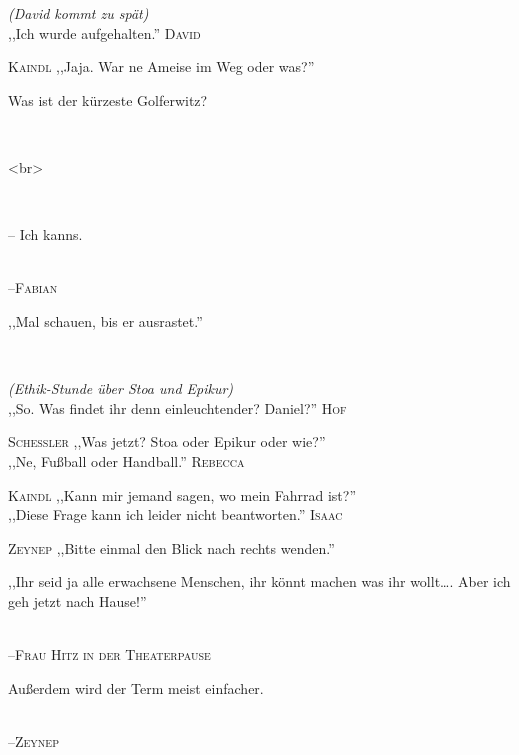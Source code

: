 \vspace{3mm}
\raggedright \emph{\footnotesize (David kommt zu spät)}\\
\raggedleft ,,Ich wurde aufgehalten.'' \textsc{\footnotesize David}\\
\hangindent=0.7cm
\raggedright \textsc{\footnotesize Kaindl} ,,Jaja. War ne Ameise im Weg oder was?''\\

\vspace{3mm}
{\raggedright Was ist der kürzeste Golferwitz?}\\
{\raggedright <br>}\\
{\raggedright -- Ich kanns.}\\
\raggedleft \textsc{\footnotesize --\/Fabian}\\

\vspace{3mm}
{\raggedright ,,Mal schauen, bis er ausrastet.''}\\

\vspace{3mm}
\raggedright \emph{\footnotesize (Ethik-Stunde über Stoa und Epikur)}\\
\raggedleft ,,So. Was findet ihr denn einleuchtender? Daniel?'' \textsc{\footnotesize Hof}\\
\hangindent=0.7cm
\raggedright \textsc{\footnotesize Schessler} ,,Was jetzt? Stoa oder Epikur oder wie?''\\
\raggedleft ,,Ne, Fußball oder Handball.'' \textsc{\footnotesize Rebecca}\\

\vspace{3mm}
\hangindent=0.7cm
\raggedright \textsc{\footnotesize Kaindl} ,,Kann mir jemand sagen, wo mein Fahrrad ist?''\\
\raggedleft ,,Diese Frage kann ich leider nicht beantworten.'' \textsc{\footnotesize Isaac}\\
\hangindent=0.7cm
\raggedright \textsc{\footnotesize Zeynep} ,,Bitte einmal den Blick nach rechts wenden.''\\

\vspace{3mm}
{\raggedright ,,Ihr seid ja alle erwachsene Menschen, ihr könnt machen was ihr wollt…. Aber ich geh jetzt nach Hause!''}\\
\raggedleft \textsc{\footnotesize --\/Frau Hitz in der Theaterpause}\\

\vspace{3mm}
{\raggedright Außerdem wird der Term meist einfacher.}\\
\raggedleft \textsc{\footnotesize --\/Zeynep}\\

